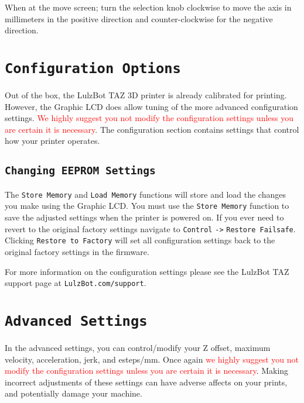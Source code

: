 When at the move screen; turn the selection knob clockwise to move the axis in millimeters in the positive direction and counter-clockwise for the negative direction. 

\section{\texttt{Configuration Options}} 


Out of the box, the LulzBot TAZ 3D printer is already calibrated for printing. However, the Graphic LCD does allow tuning of the more advanced configuration settings. \textcolor{red}{We highly suggest you not modify the configuration settings unless you are certain it is necessary}. The configuration section contains settings that control how your printer operates.

\subsection{\texttt{Changing EEPROM Settings}}
The \texttt{Store Memory} and \texttt{Load Memory} functions will store and load the changes you make using the Graphic LCD. You must use the \texttt{Store Memory} function to save the adjusted settings when the printer is powered on. If you ever need to revert to the original factory settings navigate to \texttt{Control} \texttt{->} \texttt{Restore Failsafe}. Clicking \texttt{Restore to Factory} will set all configuration settings back to the original factory settings in the firmware.

For more information on the configuration settings please see the LulzBot TAZ support page at \texttt{LulzBot.com/support}.

\section{\texttt{Advanced Settings}}
In the advanced settings, you can control/modify your Z offset, maximum velocity, acceleration, jerk, and esteps/mm. Once again \textcolor{red}{we highly suggest you not modify the configuration settings unless you are certain it is necessary}. Making incorrect adjustments of these settings can have adverse affects on your prints, and potentially damage your machine.

